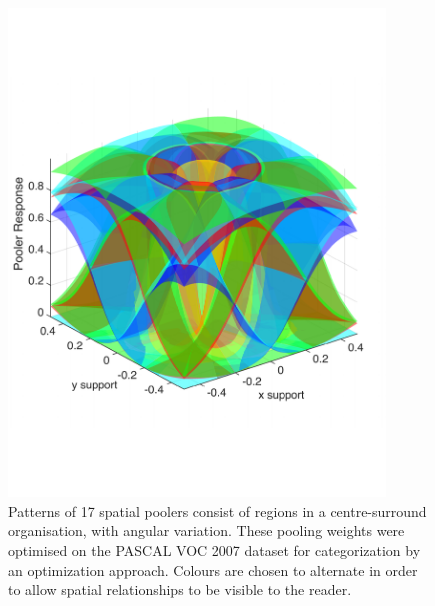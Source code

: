 \begin{figure}[!h]
\begin{center}
\includegraphics[width=10cm,trim=0cm 3cm 0cm 3cm,clip=true]{gfx/Chapter06/PoolerResponses.pdf}
\caption{\label{fig:PoolerResponses}Patterns of 17 spatial poolers consist of regions in a centre-surround organisation, with angular variation.  These pooling weights were optimised on the PASCAL VOC 2007 dataset for categorization by an optimization approach. Colours are chosen to alternate in order to allow spatial relationships to be visible to the reader.}
\end{center}
\end{figure}


